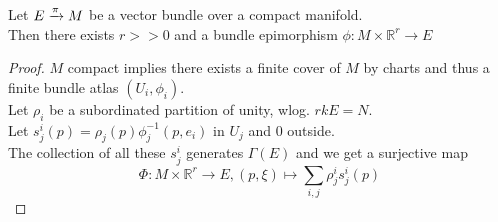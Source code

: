 \documentclass[../main.tex]{subfiles}
\begin{document}
\begin{propo}
Let $E\xrightarrow{\pi} M$ be a vector bundle over a compact manifold.\\
Then there exists $r>>0$ and a bundle epimorphism $\phi: M\times \mathbb{R}^{r}\to E$
\end{propo}
\begin{proof}
$M$ compact implies there exists a finite cover of $M$ by charts and thus a finite bundle atlas $( U_i,\phi_i) $.\\
Let $\rho_i$ be a subordinated partition of unity, wlog. $rk E = N$.\\
Let $s_j^{i}( p) = \rho_j ( p) \phi_j^{-1}( p,e_i) $ in $U_j$ and $0$ outside.\\
The collection of all these $s_j^{i}$ generates $\Gamma( E) $ and we get a surjective map
\[ 
\Phi:M\times \mathbb{R}^{r}\to E, ( p,\xi) \mapsto \sum_{i,j} \rho_j^{i}s_j^{i}( p) 
\]

\end{proof}
\end{document}
